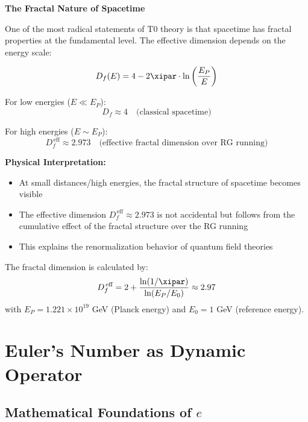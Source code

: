 	\begin{treatise}
		\textbf{The Fractal Nature of Spacetime}
		
		One of the most radical statements of T0 theory is that spacetime has fractal properties at the fundamental level. The effective dimension depends on the energy scale:
		
		\begin{equation}
			D_f(E) = 4 - 2\xipar \cdot \ln\left(\frac{E_P}{E}\right)
		\end{equation}
		
		For low energies ($E \ll E_P$):
		\begin{equation}
			D_f \approx 4 \quad \text{(classical spacetime)}
		\end{equation}
		
		For high energies ($E \sim E_P$):
		\begin{equation}
			D_f^{\,\text{eff}} \approx 2.973 \quad \text{(effective fractal dimension over RG running)}
		\end{equation}
		
		\textbf{Physical Interpretation:}
		\begin{itemize}
			\item At small distances/high energies, the fractal structure of spacetime becomes visible
			\item The effective dimension $D_f^{\,\text{eff}} \approx 2.973$ is not accidental but follows from the cumulative effect of the fractal structure over the RG running
			\item This explains the renormalization behavior of quantum field theories
		\end{itemize}
		
		The fractal dimension is calculated by:
		\begin{equation}
			D_f^{\,\text{eff}} = 2 + \frac{\ln(1/\xipar)}{\ln(E_P/E_0)} \approx 2.97
		\end{equation}
		with $E_P = 1.221 \times 10^{19}$ GeV (Planck energy) and $E_0 = 1$ GeV (reference energy).
	\end{treatise}
	
	\section{Euler's Number as Dynamic Operator}
	
	\subsection{Mathematical Foundations of $e$}
	

